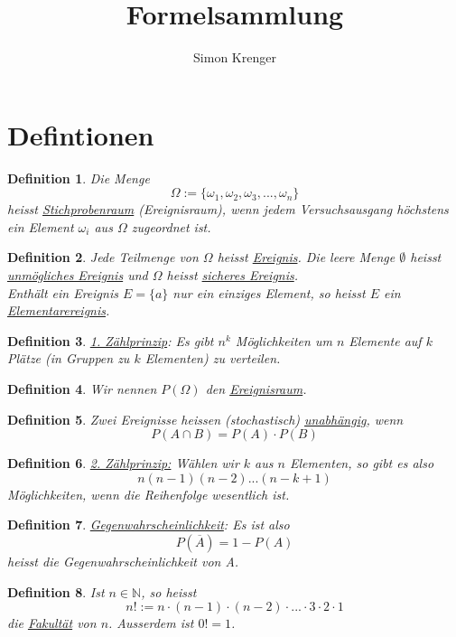 \documentclass{article}
\title{Formelsammlung}
\author{Simon Krenger}
\newtheorem{mydef}{Definition}
\begin{document}
\section{Defintionen}
\begin{mydef}
Die Menge
\begin{equation}
\Omega := \{ \omega_1, \omega_2, \omega_3, ..., \omega_n \}
\end{equation}
heisst \underline{Stichprobenraum} (Ereignisraum), wenn jedem Versuchsausgang höchstens ein Element $\omega_i$ aus $\Omega$ zugeordnet ist.
\end{mydef}
\begin{mydef}
Jede Teilmenge von $\Omega$ heisst \underline{Ereignis}. Die leere Menge $\emptyset$ heisst \underline{unmögliches Ereignis} und $\Omega$ heisst \underline{sicheres Ereignis}.\\
Enthält ein Ereignis $E = \{ a \}$ nur ein einziges Element, so heisst $E$ ein \underline{Elementarereignis}.
\end{mydef}
\begin{mydef}
\underline{1. Zählprinzip}: Es gibt $n^k$ Möglichkeiten um $n$ Elemente auf $k$ Plätze (in Gruppen zu $k$ Elementen) zu verteilen.
\end{mydef}
\begin{mydef}
Wir nennen $P(\Omega)$ den \underline{Ereignisraum}.
\end{mydef}
\begin{mydef}
Zwei Ereignisse heissen (stochastisch) \underline{unabhängig}, wenn
\begin{equation}
P(A \cap B) = P(A) \cdot P(B)
\end{equation}
\end{mydef}
\begin{mydef}
\underline{2. Zählprinzip:} Wählen wir $k$ aus $n$ Elementen, so gibt es also
\begin{equation}
n (n-1) (n-2) ... (n-k+1)
\end{equation}
Möglichkeiten, wenn die Reihenfolge wesentlich ist.
\end{mydef}
\begin{mydef}
\underline{Gegenwahrscheinlichkeit}: Es ist also
\begin{equation}
P(\overline{A}) = 1 - P(A)
\end{equation}
heisst die Gegenwahrscheinlichkeit von A.
\end{mydef}
\begin{mydef}
Ist $n \in \mathbb{N}$, so heisst
\begin{equation}
n! := n \cdot (n-1) \cdot (n-2) \cdot ... \cdot 3 \cdot 2 \cdot 1
\end{equation}
die \underline{Fakultät} von $n$. Ausserdem ist $0! = 1$.
\end{mydef}
\end{document}
